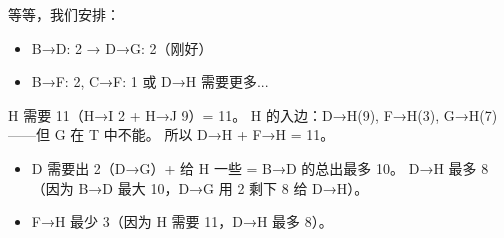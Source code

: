 \documentclass[10pt,a4paper,openany]{ctexbook}
\theoremstyle{definition}
\theoremstyle{remark}
\begin{document}
等等，我们安排：
\begin{itemize}
\item B→D: 2 → D→G: 2（刚好）
\item B→F: 2, C→F: 1 或 D→H 需要更多...

\end{itemize}

H 需要 11（H→I 2 + H→J 9）= 11。
H 的入边：D→H(9), F→H(3), G→H(7)——但 G 在 T 中不能。
所以 D→H + F→H = 11。
\begin{itemize}
\item D 需要出 2（D→G）+ 给 H 一些 = B→D 的总出最多 10。
D→H 最多 8（因为 B→D 最大 10，D→G 用 2 剩下 8 给 D→H）。

\item F→H 最少 3（因为 H 需要 11，D→H 最多 8）。

\end{itemize}
\end{document}
